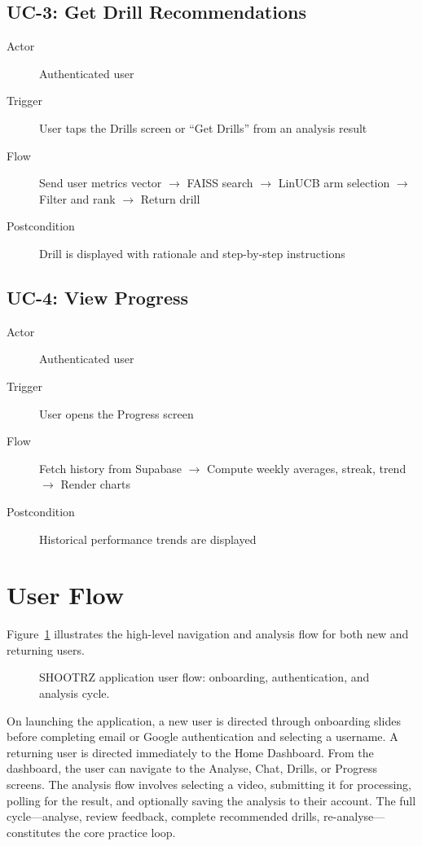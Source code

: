 \subsection{UC-3: Get Drill Recommendations}

\begin{description}
  \item[Actor] Authenticated user
  \item[Trigger] User taps the Drills screen or ``Get Drills'' from an analysis result
  \item[Flow] Send user metrics vector $\rightarrow$ FAISS search $\rightarrow$ LinUCB arm selection $\rightarrow$ Filter and rank $\rightarrow$ Return drill
  \item[Postcondition] Drill is displayed with rationale and step-by-step instructions
\end{description}

\subsection{UC-4: View Progress}

\begin{description}
  \item[Actor] Authenticated user
  \item[Trigger] User opens the Progress screen
  \item[Flow] Fetch history from Supabase $\rightarrow$ Compute weekly averages, streak, trend $\rightarrow$ Render charts
  \item[Postcondition] Historical performance trends are displayed
\end{description}

\section{User Flow}
\label{sec:user_flow}

Figure~\ref{fig:user_flow} illustrates the high-level navigation and analysis flow for both new and returning users.

\begin{figure}[H]
  \centering
  \caption{SHOOTRZ application user flow: onboarding, authentication, and analysis cycle.}
  \label{fig:user_flow}
\end{figure}

On launching the application, a new user is directed through onboarding slides before completing email or Google authentication and selecting a username. A returning user is directed immediately to the Home Dashboard. From the dashboard, the user can navigate to the Analyse, Chat, Drills, or Progress screens. The analysis flow involves selecting a video, submitting it for processing, polling for the result, and optionally saving the analysis to their account. The full cycle---analyse, review feedback, complete recommended drills, re-analyse---constitutes the core practice loop.
